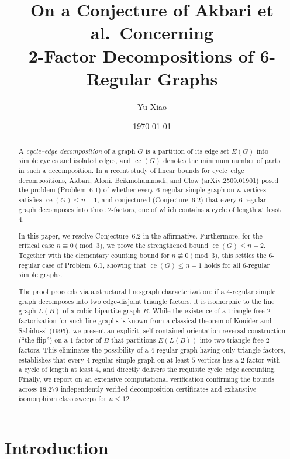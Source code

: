 \documentclass[11pt,reqno]{amsart}
\title[2-Factor Decompositions of 6-Regular Graphs]{On a Conjecture of Akbari et al.\ Concerning\\ 2-Factor Decompositions of 6-Regular Graphs}
\author{Yu Xiao}
\date{\today}
\theoremstyle{definition}
\theoremstyle{remark}
\DeclareMathOperator{\ce}{ce}
\begin{document}
\begin{abstract}
A \emph{cycle--edge decomposition} of a graph $G$ is a partition of its edge set $E(G)$ into simple cycles and isolated edges, and $\ce(G)$ denotes the minimum number of parts in such a decomposition. In a recent study of linear bounds for cycle--edge decompositions, Akbari, Aloni, Beikmohammadi, and Clow (arXiv:2509.01901) posed the problem (Problem~6.1) of whether every $6$-regular simple graph on $n$ vertices satisfies $\ce(G) \le n-1$, and conjectured (Conjecture~6.2) that every $6$-regular graph decomposes into three $2$-factors, one of which contains a cycle of length at least $4$.

In this paper, we resolve Conjecture~6.2 in the affirmative. Furthermore, for the critical case $n \equiv 0 \pmod 3$, we prove the strengthened bound $\ce(G) \le n-2$. Together with the elementary counting bound for $n \not\equiv 0 \pmod 3$, this settles the $6$-regular case of Problem~6.1, showing that $\ce(G) \le n-1$ holds for all $6$-regular simple graphs.

The proof proceeds via a structural line-graph characterization: if a $4$-regular simple graph decomposes into two edge-disjoint triangle factors, it is isomorphic to the line graph $L(B)$ of a cubic bipartite graph $B$. While the existence of a triangle-free $2$-factorization for such line graphs is known from a classical theorem of Kouider and Sabidussi (1995), we present an explicit, self-contained orientation-reversal construction (``the flip'') on a $1$-factor of $B$ that partitions $E(L(B))$ into two triangle-free $2$-factors. This eliminates the possibility of a $4$-regular graph having only triangle factors, establishes that every $4$-regular simple graph on at least $5$ vertices has a $2$-factor with a cycle of length at least $4$, and directly delivers the requisite cycle--edge accounting. Finally, we report on an extensive computational verification confirming the bounds across 18,279 independently verified decomposition certificates and exhaustive isomorphism class sweeps for $n \le 12$.
\end{abstract}

\maketitle

\section{Introduction}\label{sec:intro}
\end{document}

